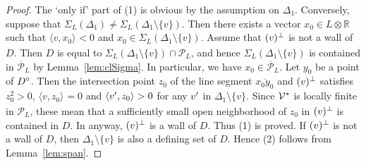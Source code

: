 \documentclass{amsart}
\theoremstyle{plain}
\theoremstyle{definition}
\theoremstyle{remark}
\numberwithin{equation}{section}
\numberwithin{table}{section}
\numberwithin{figure}{section}
\newcommand{\R}{\mathord{\mathbb R}}
\newcommand{\PPP}{\mathord{\mathcal P}}
\newcommand{\VVV}{\mathord{\mathcal V}}
\newcommand{\tensor}{\otimes}
\newcommand{\sprime}{\sp\prime}
\newcommand{\spcirc}{\sp{\mathord{\circ}}}
\newcommand{\sperp}{\sp{\perp}}
\newcommand{\intM}[2]{\langle{#1}\rangle_{#2}}
\newcommand{\sphyp}{\sp*}
\newcommand{\clPPP}{\overline{\PPP}}
\newcommand{\lineseg}[1]{\overline{#1}}
\begin{document}
%
\begin{proof}
 The `only if' part of  (1) is obvious by the assumption on $\Delta_1$.
Conversely, suppose that $\Sigma_L(\Delta_1) \ne \Sigma_L(\Delta_1\setminus \{v\})$.
 Then 
 there exists a vector  $x_0\in L\tensor\R$ such that 
$\intM{v, x_0}{}<0$ and $x_0\in \Sigma_L(\Delta_1\setminus \{v\})$.
 Assume  that $(v)\sperp$ is not a wall of $D$.
Then  $D$ is equal to  $\Sigma_L(\Delta_1\setminus \{v\})\cap \PPP_L$,
and hence $\Sigma_L(\Delta_1\setminus \{v\})$ is contained in $\clPPP_L$
 by Lemma~\ref{lem:clSigma}.
 In particular, we have $x_0\in \clPPP_L$.
Let $y_0$ be a point of $D\spcirc$.
Then the intersection point  $z_0$ of the line segment $\lineseg{x_0y_0}$
and $(v)\sperp$ satisfies $z_0^2> 0$, $\intM{v, z_0}{}=0$ and $\intM{v\sprime, z_0}{}>0$
for any $v\sprime$ in $\Delta_1\setminus \{v\}$.
Since $\VVV\sphyp$ is locally finite in $\PPP_L$, 
these  mean that a sufficiently small open neighborhood of $z_0$ in $(v)\sperp$ is 
contained in $D$.
In anyway,
$(v)\sperp$ is a wall of $D$.
Thus (1) is proved.
If $(v)\sperp$ is not a wall of $D$, then $\Delta_1\setminus\{v\}$ is also a defining set of $D$.
Hence (2) follows from  Lemma~\ref{lem:span}.
 \end{proof}
\end{document}
